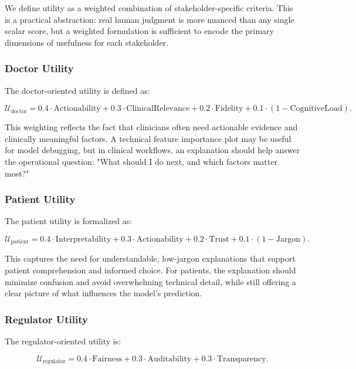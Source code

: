 \documentclass{article}
\begin{document}
We define utility as a weighted combination of stakeholder-specific criteria. This is a practical abstraction: real human judgment is more nuanced than any single scalar score, but a weighted formulation is sufficient to encode the primary dimensions of usefulness for each stakeholder.

\subsubsection{Doctor Utility}

The doctor-oriented utility is defined as:

\begin{equation}
\mathcal{U}_{\text{doctor}} = 0.4\cdot\text{Actionability} + 0.3\cdot\text{ClinicalRelevance} + 0.2\cdot\text{Fidelity} + 0.1\cdot(1-\text{CognitiveLoad}).
\end{equation}

This weighting reflects the fact that clinicians often need actionable evidence and clinically meaningful factors. A technical feature importance plot may be useful for model debugging, but in clinical workflows, an explanation should help answer the operational question: "What should I do next, and which factors matter most?"

\subsubsection{Patient Utility}

The patient utility is formalized as:

\begin{equation}
\mathcal{U}_{\text{patient}} = 0.4\cdot\text{Interpretability} + 0.3\cdot\text{Actionability} + 0.2\cdot\text{Trust} + 0.1\cdot(1-\text{Jargon}).
\end{equation}

This captures the need for understandable, low-jargon explanations that support patient comprehension and informed choice. For patients, the explanation should minimize confusion and avoid overwhelming technical detail, while still offering a clear picture of what influences the model's prediction.

\subsubsection{Regulator Utility}

The regulator-oriented utility is:

\begin{equation}
\mathcal{U}_{\text{regulator}} = 0.4\cdot\text{Fairness} + 0.3\cdot\text{Auditability} + 0.3\cdot\text{Transparency}.
\end{equation}
\end{document}

